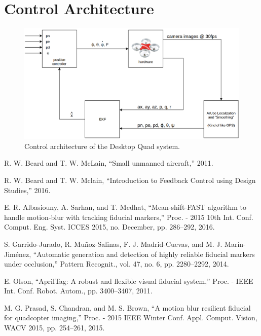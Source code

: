 \documentclass[dvips,12pt]{article}
\begin{document}
\section{Control Architecture}

\begin{figure}[H]
	\centering
	\includegraphics[width=\textwidth]{desktopquad_control_arch}
	\caption{Control architecture of the Desktop Quad system.}
	\label{fig:architecture}
\end{figure}


\begin{thebibliography}{9}
\singlespace

 R. W. Beard and T. W. McLain, “Small unmanned aircraft,” 2011.

 R. W. Beard and T. W. Mclain, “Introduction to Feedback Control using Design Studies,” 2016.

 E. R. Albasiouny, A. Sarhan, and T. Medhat, “Mean-shift-FAST algorithm to handle motion-blur with tracking fiducial markers,” Proc. - 2015 10th Int. Conf. Comput. Eng. Syst. ICCES 2015, no. December, pp. 286–292, 2016.

 S. Garrido-Jurado, R. Muñoz-Salinas, F. J. Madrid-Cuevas, and M. J. Marín-Jiménez, “Automatic generation and detection of highly reliable fiducial markers under occlusion,” Pattern Recognit., vol. 47, no. 6, pp. 2280–2292, 2014.

 E. Olson, “AprilTag: A robust and flexible visual fiducial system,” Proc. - IEEE Int. Conf. Robot. Autom., pp. 3400–3407, 2011.

 M. G. Prasad, S. Chandran, and M. S. Brown, “A motion blur resilient fiducial for quadcopter imaging,” Proc. - 2015 IEEE Winter Conf. Appl. Comput. Vision, WACV 2015, pp. 254–261, 2015.

\end{thebibliography}
\end{document}

